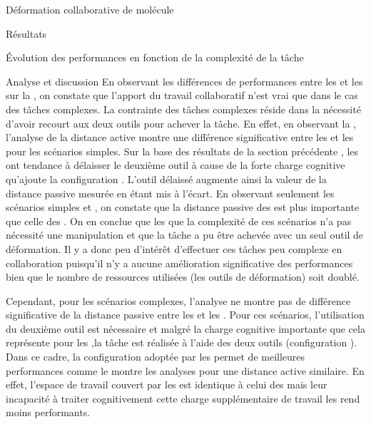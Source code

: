 \documentclass[myfrancais,ngerman,english,frenchb]{mythesis}
\begin{document}
\begin{mychapter}{Déformation collaborative de molécule}
\begin{mysection}{Résultats}
\begin{mysubsection}{Évolution des performances en fonction de la complexité de la tâche}
\begin{mysubsubsection}{Analyse et discussion}
					En observant les différences de performances entre les  et les  sur la , on constate que l'apport du travail collaboratif n'est vrai que dans le cas des tâches complexes.
					La contrainte des tâches complexes réside dans la nécessité d'avoir recourt aux deux outils pour achever la tâche.
					En effet, en observant la , l'analyse de la distance active montre une différence significative entre les  et les  pour les scénarios simples.
					Sur la base des résultats de la section précédente , les  ont tendance à délaisser le deuxième outil à cause de la forte charge cognitive qu'ajoute la configuration .
					L'outil délaissé augmente ainsi la valeur de la distance passive mesurée en étant mis à l'écart.
					En observant seulement les scénarios simples  et , on constate que la distance passive des  est plus importante que celle des .
					On en conclue que les  que la complexité de ces scénarios n'a pas nécessité une manipulation  et que la tâche a pu être achevée avec un seul outil de déformation.
					Il y a donc peu d'intérêt d'effectuer ces tâches peu complexe en collaboration puisqu'il n'y a aucune amélioration significative des performances bien que le nombre de ressources utilisées (les outils de déformation) soit doublé.

					Cependant, pour les scénarios complexes, l'analyse ne montre pas de différence significative de la distance passive entre les  et les .
					Pour ces scénarios, l'utilisation du deuxième outil est nécessaire et malgré la charge cognitive importante que cela représente pour les ,la tâche est réalisée à l'aide des deux outils (configuration ).
					Dans ce cadre, la configuration  adoptée par les  permet de meilleures performances comme le montre les analyses pour une distance active similaire.
					En effet, l'espace de travail couvert par les  est identique à celui des  mais leur incapacité à traiter cognitivement cette charge supplémentaire de travail les rend moins performants.


\end{mysubsubsection}
\end{mysubsection}
\end{mysection}
\end{mychapter}
\end{document}
